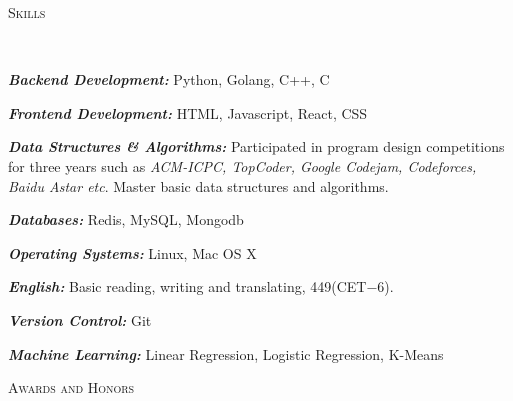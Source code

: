 ﻿\documentclass[9pt]{article}
\newenvironment{changemargin}[2]{%
  \begin{list}{}{%
    \setlength{\topsep}{0pt}%
    \setlength{\leftmargin}{#1}%
    \setlength{\rightmargin}{#2}%
    \setlength{\listparindent}{\parindent}%
    \setlength{\itemindent}{\parindent}%
    \setlength{\parsep}{\parskip}%
  }%
  \item[]}{\end{list}
}
\newcommand{\lineover}{
	\begin{changemargin}{-0.05in}{-0.05in}
		\vspace*{-8pt}
		\hrulefill \\
		\vspace*{-2pt}
	\end{changemargin}
}
\newcommand{\header}[1]{
	\begin{changemargin}{-0.5in}{-0.5in}
		\scshape{#1}\\
  	\lineover
	\end{changemargin}
}
\newenvironment{body} {
	\vspace*{-16pt}
	\begin{changemargin}{-0.25in}{-0.5in}
  }
	{\end{changemargin}
}
\begin{document}
\header{Skills}

\begin{body}
	\vspace{14pt}
	\emph{\textbf{Backend Development:}}{} Python, Golang, C++, C \\
	\medskip

    \emph{\textbf{Frontend Development:}}{} HTML, Javascript, React, CSS \\
    \medskip

    \emph{\textbf{Data Structures \& Algorithms:}}{} Participated in program design competitions for three years such as \emph{ACM-ICPC,
TopCoder, Google Codejam, Codeforces, Baidu Astar etc}. Master basic data structures and algorithms.\\
    \medskip

    \emph{\textbf{Databases:}}{} Redis, MySQL, Mongodb \\
    \medskip

    \emph{\textbf{Operating Systems:}}{} Linux, Mac OS X \\
    \medskip

    \emph{\textbf{English:}}{} Basic reading, writing and translating, 449(CET$-$6).\\
    \medskip

    \emph{\textbf{Version Control:}}{} Git
    \medskip

    \emph{\textbf{Machine Learning:}}{} Linear Regression, Logistic Regression, K-Means

\end{body}

\smallskip

\newpage
\header{Awards and Honors}
\end{document}
